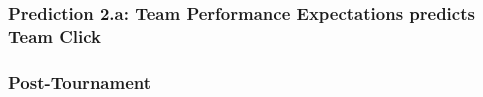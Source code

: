\begin{CJK}{UTF8}{gbsn}
















       \subsubsection{Prediction 2.a: Team Performance Expectations predicts Team Click}


       \subsubsection{Post-Tournament}


\end{CJK}
